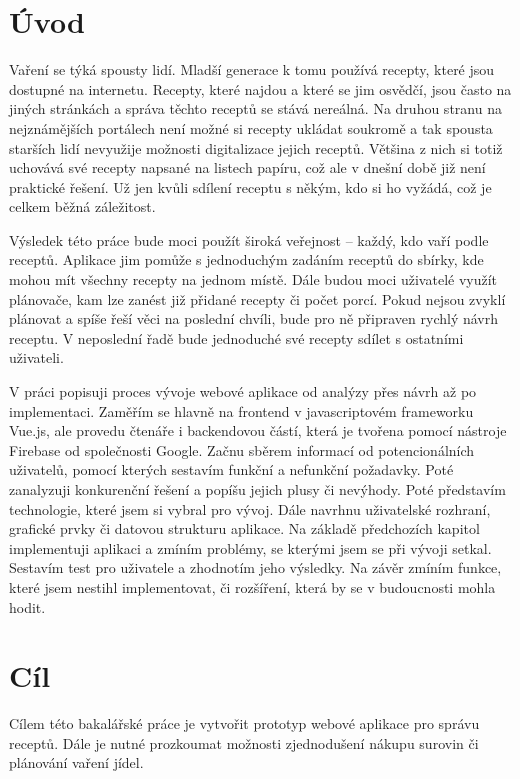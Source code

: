 
\chapter{Úvod}

Vaření se týká spousty lidí. Mladší generace k tomu používá recepty, které jsou dostupné na internetu. Recepty, které najdou
a které se jim osvědčí, jsou často na jiných stránkách a správa těchto receptů se stává nereálná. Na druhou stranu na nejznámějších
portálech není možné si recepty ukládat soukromě a tak spousta starších lidí nevyužije možnosti digitalizace jejich receptů.
Většina z nich si totiž uchovává své recepty napsané na listech papíru, což ale v dnešní době již není praktické řešení. Už jen kvůli
sdílení receptu s někým, kdo si ho vyžádá, což je celkem běžná záležitost.

Výsledek této práce bude moci použít široká veřejnost -- každý, kdo vaří podle receptů. Aplikace jim pomůže s jednoduchým
zadáním receptů do sbírky, kde mohou mít všechny recepty na jednom místě. Dále budou moci uživatelé využít plánovače, kam
lze zanést již přidané recepty či počet porcí. Pokud nejsou zvyklí plánovat a spíše řeší věci na poslední chvíli, bude
pro ně připraven rychlý návrh receptu. V neposlední řadě bude jednoduché své recepty sdílet s ostatními uživateli.

V práci popisuji proces vývoje webové aplikace od analýzy přes návrh až po implementaci. Zaměřím se hlavně na frontend v
javascriptovém frameworku Vue.js, ale provedu čtenáře i backendovou částí, která je tvořena pomocí nástroje Firebase od
společnosti Google. Začnu sběrem informací od potencionálních uživatelů, pomocí kterých sestavím funkční a nefunkční požadavky.
Poté zanalyzuji konkurenční řešení a popíšu jejich plusy či nevýhody. Poté představím technologie, které jsem si vybral pro
vývoj. Dále navrhnu uživatelské rozhraní, grafické prvky či datovou strukturu aplikace. Na základě předchozích kapitol implementuji
aplikaci a zmíním problémy, se kterými jsem se při vývoji setkal. Sestavím test pro uživatele a zhodnotím jeho výsledky.
Na závěr zmíním funkce, které jsem nestihl implementovat, či rozšíření, která by se v budoucnosti mohla hodit.

\chapter{Cíl}
Cílem této bakalářské práce je vytvořit prototyp webové aplikace pro správu receptů. Dále je nutné prozkoumat možnosti
zjednodušení nákupu surovin či plánování vaření jídel.


